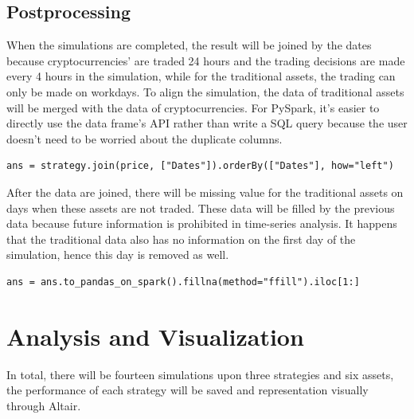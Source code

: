 \documentclass[a4paper]{article}
\begin{document}
\subsection{Postprocessing}
When the simulations are completed, the result will be joined by the dates because cryptocurrencies’ are traded 24 hours and the trading decisions are made every 4 hours in the simulation, while for the traditional assets, the trading can only be made on workdays. To align the simulation, the data of traditional assets will be merged with the data of cryptocurrencies. For PySpark, it's easier to directly use the data frame's API rather than write a SQL query because the user doesn't need to be worried about the duplicate columns.
\begin{verbatim}
ans = strategy.join(price, ["Dates"]).orderBy(["Dates"], how="left")
\end{verbatim}
After the data are joined, there will be missing value for the traditional assets on days when these assets are not traded. These data will be filled by the previous data because future information is prohibited in time-series analysis. It happens that the traditional data also has no information on the first day of the simulation, hence this day is removed as well. 
\begin{verbatim}
ans = ans.to_pandas_on_spark().fillna(method="ffill").iloc[1:]
\end{verbatim}
\section{Analysis and Visualization}
In total, there will be fourteen simulations upon three strategies and six assets, the performance of each strategy will be saved and representation visually through Altair.
\end{document}

